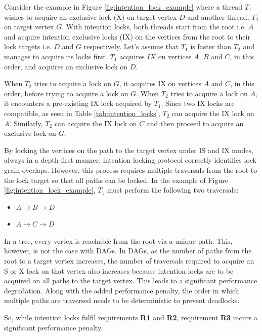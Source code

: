 Consider the example in Figure \ref{fig:intention_lock_example} where a thread $T_1$ wishes to acquire an exclusive lock (X) on target vertex $D$ and another thread, $T_2$ on target vertex $G$. 
With intention locks, both threads start from the root i.e. $A$ and acquire intention exclusive locks (IX) on the vertices from the root to their lock targets i.e. $D$ and $G$ respectively. 
Let's assume that $T_1$ is faster than $T_2$ and manages to acquire its locks first. 
$T_1$ acquires $IX$ on vertices $A$, $B$ and $C$, in this order, and acquires an exclusive lock on $D$. 

When $T_2$ tries to acquire a lock on $G$, it acquires IX on vertices $A$ and $C$, in this order, before trying to acquire a lock on $G$. 
When $T_2$ tries to acquire a lock on $A$, it encounters a pre-existing  IX lock acquired by $T_1$. 
Since two IX locks are compatible, as seen in Table \ref{tab:intention_locks}, $T_2$ can acquire the IX lock on $A$.
Similarly, $T_2$ can acquire the IX lock on $C$ and then proceed to acquire an exclusive lock on $G$.


By locking the vertices on the path to the target vertex under IS and IX modes, always in a depth-first manner, 
intention locking protocol correctly identifies lock grain overlaps. 
However, this process requires multiple traversals from the root to the lock target so that all paths can be locked. 
In the example of Figure \ref{fig:intention_lock_example}, $T_1$ must perform the following two traversals:

\begin{itemize}
    \item $A \rightarrow B \rightarrow D$
    \item $A \rightarrow C \rightarrow D$
\end{itemize}

In a tree, every vertex is reachable from the root via a unique path. 
This, however, is not the case with DAGs.
In DAGs, as the number of paths from the root to a target vertex increases, the number of traversals required to acquire an S or X lock on that vertex also increases because intention locks are to be acquired on all paths to the target vertex.
This leads to a significant performance degradation. Along with the added performance penalty, the order in which multiple paths are traversed needs to be deterministic to prevent deadlocks.  

So, while intention locks fulfil requirements \textbf{R1} and \textbf{R2}, requirement \textbf{R3} incurs a significant performance penalty. 

